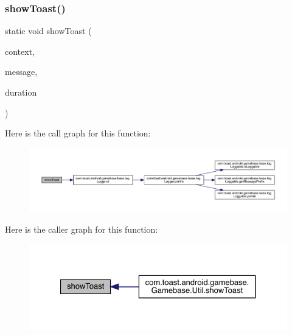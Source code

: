 \subsubsection{\texorpdfstring{show\+Toast()}{showToast()}}
{\footnotesize\ttfamily static void show\+Toast (\begin{DoxyParamCaption}\item[{@Non\+Null final Context}]{context,  }\item[{@Non\+Null final String}]{message,  }\item[{@\hyperlink{interfacecom_1_1toast_1_1android_1_1gamebase_1_1base_1_1annotation_1_1_toast_duration}{Toast\+Duration} final int}]{duration }\end{DoxyParamCaption})\hspace{0.3cm}{\ttfamily [static]}}

Here is the call graph for this function\+:
\nopagebreak
\begin{figure}[H]
\begin{center}
\leavevmode
\includegraphics[width=350pt]{classcom_1_1toast_1_1android_1_1gamebase_1_1base_1_1ui_1_1_simple_toast_a8b9467dd0c63451fd09c70941c0ef736_cgraph}
\end{center}
\end{figure}
Here is the caller graph for this function\+:
\nopagebreak
\begin{figure}[H]
\begin{center}
\leavevmode
\includegraphics[width=327pt]{classcom_1_1toast_1_1android_1_1gamebase_1_1base_1_1ui_1_1_simple_toast_a8b9467dd0c63451fd09c70941c0ef736_icgraph}
\end{center}
\end{figure}
